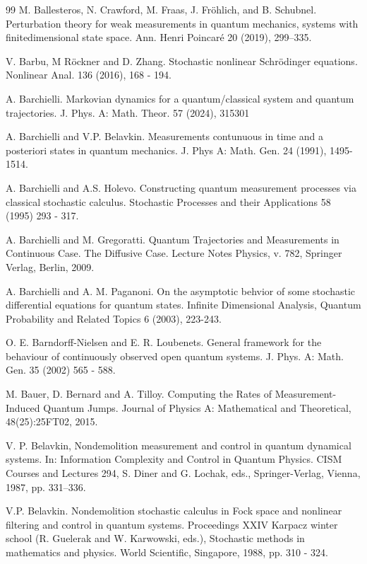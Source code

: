 \documentclass[12pt]{article}
\begin{document}
\begin{thebibliography}{99}
M. Ballesteros, N. Crawford, M. Fraas, J. Fr\"ohlich, and B. Schubnel.
Perturbation theory for weak measurements in quantum mechanics, systems with finitedimensional
state space. Ann. Henri Poincar\'e 20 (2019), 299–335.

V. Barbu, M R\"ockner and D. Zhang. Stochastic nonlinear Schrödinger equations.
Nonlinear Anal. 136 (2016), 168 - 194.

A. Barchielli. Markovian dynamics for a quantum/classical system
and quantum trajectories. J. Phys. A: Math. Theor. 57 (2024), 315301


A. Barchielli and V.P. Belavkin. Measurements contunuous
in time and a posteriori states in quantum mechanics.
J. Phys A: Math. Gen. 24 (1991), 1495-1514.

A. Barchielli and A.S. Holevo.
Constructing quantum measurement processes via classical
stochastic calculus. Stochastic Processes and their Applications 58 (1995) 293 - 317.

A. Barchielli and M. Gregoratti. Quantum Trajectories
and Measurements in Continuous Case. The Diffusive Case.
 Lecture Notes Physics, v. 782, Springer Verlag, Berlin, 2009.


A. Barchielli and A. M. Paganoni. On the asymptotic behvior of some stochastic
differential equations for quantum states.
Infinite Dimensional Analysis, Quantum Probability and Related Topics 6 (2003), 223-243.

O. E. Barndorff-Nielsen and E. R. Loubenets.
General framework for the behaviour of continuously
observed open quantum systems.
J. Phys. A: Math. Gen. 35 (2002) 565 - 588.

M. Bauer,  D. Bernard and A. Tilloy.
Computing the Rates of Measurement-Induced Quantum Jumps.
 Journal of Physics A: Mathematical and Theoretical,
48(25):25FT02, 2015.

 V. P. Belavkin, Nondemolition measurement and control in quantum dynamical systems.
 In: Information Complexity and Control in Quantum Physics.
CISM Courses and Lectures 294, S. Diner and G. Lochak, eds., Springer-Verlag, Vienna, 1987, pp. 331–336.

V.P. Belavkin. Nondemolition stochastic calculus in Fock space and nonlinear
filtering and control in quantum systems. Proceedings XXIV Karpacz winter school
(R. Guelerak and W. Karwowski, eds.), Stochastic methods in mathematics and physics.
 World Scientific, Singapore, 1988, pp. 310 - 324.


\end{thebibliography}
\end{document}
